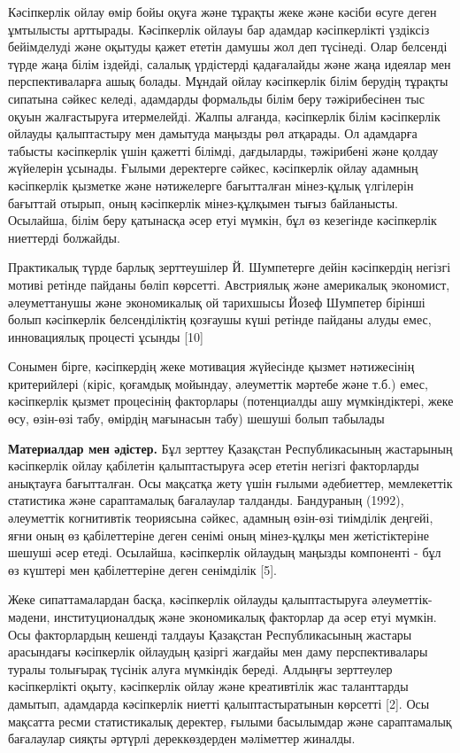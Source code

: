 \begin{multicols}{2}
Кәсіпкерлік ойлау өмір бойы оқуға және тұрақты жеке және кәсіби өсуге
деген ұмтылысты арттырады. Кәсіпкерлік ойлауы бар адамдар кәсіпкерлікті
үздіксіз бейімделуді және оқытуды қажет ететін дамушы жол деп түсінеді.
Олар белсенді түрде жаңа білім іздейді, салалық үрдістерді қадағалайды
және жаңа идеялар мен перспективаларға ашық болады. Мұндай ойлау
кәсіпкерлік білім берудің тұрақты сипатына сәйкес келеді, адамдарды
формальды білім беру тәжірибесінен тыс оқуын жалғастыруға итермелейді.
Жалпы алғанда, кәсіпкерлік білім кәсіпкерлік ойлауды қалыптастыру мен
дамытуда маңызды рөл атқарады. Ол адамдарға табысты кәсіпкерлік үшін
қажетті білімді, дағдыларды, тәжірибені және қолдау жүйелерін ұсынады.
Ғылыми деректерге сәйкес, кәсіпкерлік ойлау адамның кәсіпкерлік қызметке
және нәтижелерге бағытталған мінез-құлық үлгілерін бағыттай отырып, оның
кәсіпкерлік мінез-құлқымен тығыз байланысты. Осылайша, білім беру
қатынасқа әсер етуі мүмкін, бұл өз кезегінде кәсіпкерлік ниеттерді
болжайды.

Практикалық түрде барлық зерттеушілер \linebreak Й. Шумпетерге дейін кәсіпкердің
негізгі мотиві ретінде пайданы бөліп көрсетті. Австриялық және
америкалық экономист, әлеуметтанушы және экономикалық ой тарихшысы Йозеф
Шумпетер бірінші болып кәсіпкерлік белсенділіктің қозғаушы күші ретінде
пайданы алуды емес, инновациялық процесті ұсынды {[}10{]}

Сонымен бірге, кәсіпкердің жеке мотивация жүйесінде қызмет нәтижесінің
критерийлері (кіріс, қоғамдық мойындау, әлеуметтік мәртебе және т.б.)
емес, кәсіпкерлік қызмет процесінің факторлары (потенциалды ашу
мүмкіндіктері, жеке өсу, өзін-өзі табу, өмірдің мағынасын табу) шешуші
болып табылады

{\bfseries Материалдар мен әдістер.} Бұл зерттеу Қазақстан Республикасының
жастарының кәсіпкерлік ойлау қабілетін қалыптастыруға әсер ететін
негізгі факторларды анықтауға бағытталған. Осы мақсатқа жету үшін ғылыми
әдебиеттер, мемлекеттік статистика және сараптамалық бағалаулар
талданды. Бандураның (1992), әлеуметтік когнитивтік теориясына сәйкес,
адамның өзін-өзі тиімділік деңгейі, яғни оның өз қабілеттеріне деген
сенімі оның мінез-құлқы мен жетістіктеріне шешуші әсер етеді. Осылайша,
кәсіпкерлік ойлаудың маңызды компоненті - бұл өз күштері мен
қабілеттеріне деген сенімділік {[}5{]}.

Жеке сипаттамалардан басқа, кәсіпкерлік ойлауды қалыптастыруға
әлеуметтік-мәдени, институционалдық және экономикалық факторлар да әсер
етуі мүмкін. Осы факторлардың кешенді талдауы Қазақстан Республикасының
жастары арасындағы кәсіпкерлік ойлаудың қазіргі жағдайы мен даму
перспективалары туралы толығырақ түсінік алуға мүмкіндік береді. Алдыңғы
зерттеулер кәсіпкерлікті оқыту, кәсіпкерлік ойлау және креативтілік жас
таланттарды дамытып, адамдарда кәсіпкерлік ниетті қалыптастыратынын
көрсетті {[}2{]}. Осы мақсатта ресми статистикалық деректер, ғылыми
басылымдар және сараптамалық бағалаулар сияқты әртүрлі дереккөздерден
мәліметтер жиналды.


\end{multicols}
